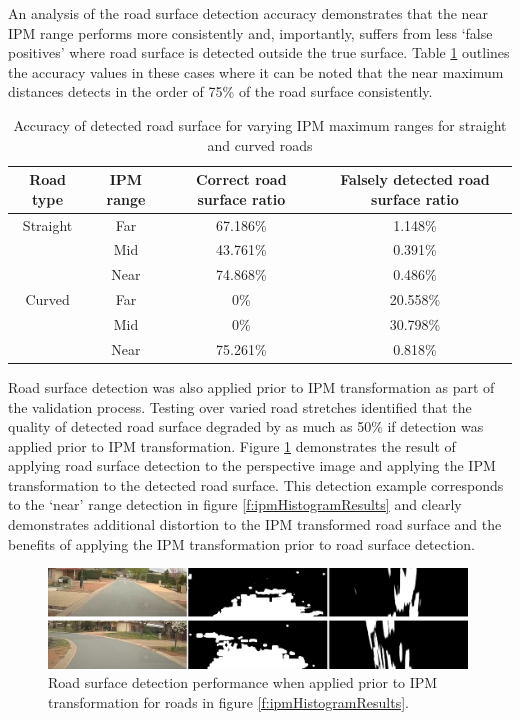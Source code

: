\documentclass[]{aiaa-tc}%
\begin{document}
An analysis of the road surface detection accuracy demonstrates that the near IPM range performs more consistently and, importantly, suffers from less `false positives' where road surface is detected outside the true surface. Table \ref{t:ipmRangeRoadSurface} outlines the accuracy values in these cases where it can be noted that the near maximum distances detects in the order of 75\% of the road surface consistently. 


\begin{table}[]
	\centering
	\begin{tabular}{@{}cccc@{}}
		\toprule
		Road type & IPM range & Correct road surface ratio & Falsely detected road surface ratio \\ \midrule
		Straight  & Far       & 67.186\%                   & 1.148\%                             \\
		& Mid       & 43.761\%                   & 0.391\%                             \\
		& Near      & 74.868\%                   & 0.486\%                             \\
		Curved    & Far       & 0\%                        & 20.558\%                            \\
		& Mid       & 0\%                        & 30.798\%                            \\
		& Near      & 75.261\%                   & 0.818\%                             \\ \bottomrule
	\end{tabular}
	\caption{Accuracy of detected road surface for varying IPM maximum ranges for straight and curved roads}
	\label{t:ipmRangeRoadSurface}
\end{table}

Road surface detection was also applied prior to IPM transformation as part of the validation process. Testing over varied road stretches identified that the quality of detected road surface degraded by as much as 50\% if detection was applied prior to IPM transformation. Figure \ref{f:ipmHistorgramReverse} demonstrates the result of applying road surface detection to the perspective image and applying the IPM transformation to the detected road surface. This detection example corresponds to the `near' range detection in figure \ref{f:ipmHistogramResults} and clearly demonstrates additional distortion to the IPM transformed road surface and the benefits of applying the IPM transformation prior to road surface detection.


\begin{figure}{}
	\centering
	\includegraphics[width=0.99\textwidth]{Results/ipmHistorgramReverse.png}
	\caption{Road surface detection performance when applied prior to IPM transformation for roads in figure \ref{f:ipmHistogramResults}.}
	\label{f:ipmHistorgramReverse}
\end{figure}
\end{document}
